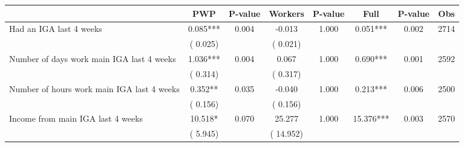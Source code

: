 
\begin{tabular}{l*{7}{c}}\hline&\multicolumn{1}{c}{PWP}&\multicolumn{1}{c}{P-value}&\multicolumn{1}{c}{Workers}&\multicolumn{1}{c}{P-value}&\multicolumn{1}{c}{Full}&\multicolumn{1}{c}{P-value}&\multicolumn{1}{c}{Obs} \\ \hline

 Had an IGA last 4 weeks       &              0.085***       &        0.004  &             -0.013       &        1.000  &              0.051***       &              0.002 &  2714 \\ 
                       &       (       0.025)             &                               &       (       0.021)                     &                               &                                               &                                &                      \\ 

 Number of days work main IGA last 4 weeks       &              1.036***       &        0.004  &              0.067       &        1.000  &              0.690***       &              0.001 &  2592 \\ 
                       &       (       0.314)             &                               &       (       0.317)                     &                               &                                               &                                &                      \\ 

 Number of hours work main IGA last 4 weeks       &              0.352**       &        0.035  &             -0.040       &        1.000  &              0.213***       &              0.006 &  2500 \\ 
                       &       (       0.156)             &                               &       (       0.156)                     &                               &                                               &                                &                      \\ 

 Income from main IGA last 4 weeks       &             10.518*       &        0.070  &             25.277       &        1.000  &             15.376***       &              0.003 &  2570 \\ 
                       &       (       5.945)             &                               &       (      14.952)                     &                               &                                               &                                &                      \\ 


\end{tabular}
